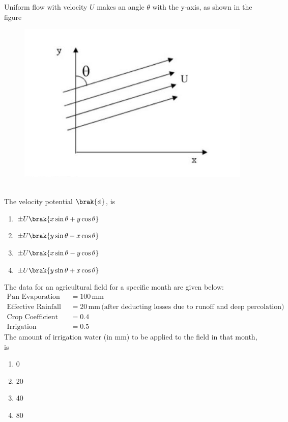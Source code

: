 \item Uniform flow with velocity $U$ makes an angle $\theta$ with the y-axis, as shown in the figure 
\begin{figure}[h!]
    \centering
    \includegraphics[width=0.5\linewidth]{GATE-yearwise/2020/figs/graph.png}
    \label{fig:enter-label}
\end{figure}\\
The velocity potential $\brak{\phi}$, is
\begin{multicols}{2}
    \begin{enumerate}
        \item $\pm U \brak{x \sin{\theta} + y \cos{\theta}}$
        \item $\pm U \brak{y \sin{\theta} - x \cos{\theta}}$
        \item $\pm U \brak{x \sin{\theta} - y \cos{\theta}}$
        \item $\pm U \brak{y \sin{\theta} + x \cos{\theta}}$
    \end{enumerate}
\end{multicols}

\item The data for an agricultural field for a specific month are given below:
\begin{align*}
    \text{Pan Evaporation} & = 100 \, \text{mm} \\
    \text{Effective Rainfall} & = 20 \, \text{mm} \, \text{(after deducting losses due to runoff and deep percolation)} \\
    \text{Crop Coefficient} & = 0.4 \\
    \text{Irrigation Efficiency} & = 0.5
\end{align*}
The amount of irrigation water (in mm) to be applied to the field in that month, is
\begin{multicols}{2}
    \begin{enumerate}
        \item 0
        \item 20
        \item 40
        \item 80
    \end{enumerate}
\end{multicols}

